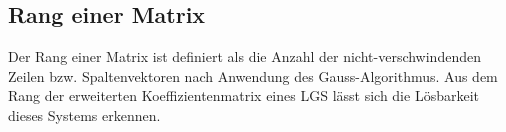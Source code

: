 \subsection{Rang einer Matrix}
\label{sub:rang_einer_matrix}
Der Rang einer Matrix ist definiert als die Anzahl der nicht-verschwindenden Zeilen bzw. Spaltenvektoren nach Anwendung
des Gauss-Algorithmus. Aus dem Rang der erweiterten Koeffizientenmatrix eines LGS lässt sich die Lösbarkeit dieses
Systems erkennen.
